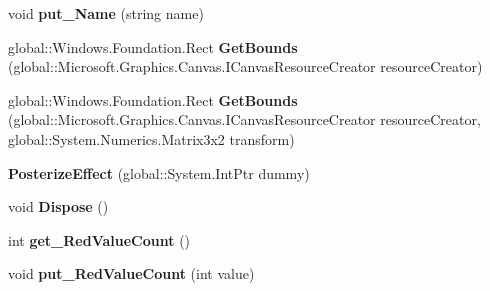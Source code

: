 \begin{DoxyCompactItemize}
void {\bfseries put\+\_\+\+Name} (string name)
\item 
\mbox{\label{class_microsoft_1_1_graphics_1_1_canvas_1_1_effects_1_1_posterize_effect_a780eb4ebaf96658240c725e269e4d9ec}} 
global\+::\+Windows.\+Foundation.\+Rect {\bfseries Get\+Bounds} (global\+::\+Microsoft.\+Graphics.\+Canvas.\+I\+Canvas\+Resource\+Creator resource\+Creator)
\item 
\mbox{\label{class_microsoft_1_1_graphics_1_1_canvas_1_1_effects_1_1_posterize_effect_a4ee2f237bc1b5167fcc5df95e29965cc}} 
global\+::\+Windows.\+Foundation.\+Rect {\bfseries Get\+Bounds} (global\+::\+Microsoft.\+Graphics.\+Canvas.\+I\+Canvas\+Resource\+Creator resource\+Creator, global\+::\+System.\+Numerics.\+Matrix3x2 transform)
\item 
\mbox{\label{class_microsoft_1_1_graphics_1_1_canvas_1_1_effects_1_1_posterize_effect_adb521c0c91dea5df611cb2166a550e59}} 
{\bfseries Posterize\+Effect} (global\+::\+System.\+Int\+Ptr dummy)
\item 
\mbox{\label{class_microsoft_1_1_graphics_1_1_canvas_1_1_effects_1_1_posterize_effect_a40d8d73e8cddc900834ed4ad7b805aec}} 
void {\bfseries Dispose} ()
\item 
\mbox{\label{class_microsoft_1_1_graphics_1_1_canvas_1_1_effects_1_1_posterize_effect_a602ceae4471fd91cd66201de4785677b}} 
int {\bfseries get\+\_\+\+Red\+Value\+Count} ()
\item 
\mbox{\label{class_microsoft_1_1_graphics_1_1_canvas_1_1_effects_1_1_posterize_effect_aedb44c1ff4ff1728164cfd3d30d80614}} 
void {\bfseries put\+\_\+\+Red\+Value\+Count} (int value)
\item 
\mbox{\label{class_microsoft_1_1_graphics_1_1_canvas_1_1_effects_1_1_posterize_effect_a7ae044e335cee042586d9c3f8c1a8d57}} 

\end{DoxyCompactItemize}
